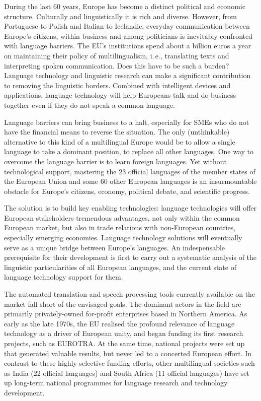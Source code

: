 \documentclass[]{../../metanetpaper}
\begin{document}
\begin{multicols}{2}

During the last 60 years, Europe has become a distinct political and economic structure. Culturally and linguistically it is rich and diverse. However, from Portuguese to Polish and Italian to Icelandic, everyday communication between Europe’s citizens, within business and among politicians is inevitably confronted with language barriers. The EU's institutions spend about a billion euros a year on maintaining their policy of multilingualism, i.\,e., translating texts and interpreting spoken communication. Does this have to be such a burden? Language technology and linguistic research can make a significant contribution to removing the linguistic borders. Combined with intelligent devices and applications, language technology will help Europeans talk and do business together even if they do not speak a common language. 


Language barriers can bring business to a halt, especially for SMEs who do not have the financial means to reverse the situation. The only (unthinkable) alternative to this kind of a multilingual Europe would be to allow a single language to take a dominant position, to replace all other languages. 
One way to overcome the language barrier is to learn foreign languages. Yet without technological support, mastering the 23 official languages of the member states of the European Union and some 60 other European languages is an insurmountable obstacle for Europe’s citizens, economy, political debate, and scientific progress. 

The solution is to build key enabling technologies: language technologies will offer European stakeholders tremendous advantages, not only within the common European market, but also in trade relations with non-European countries, especially emerging economies. Language technology solutions will eventually serve as a unique bridge between Europe's languages. An indespensable prerequisite for their development is first to carry out a systematic analysis of the linguistic particularities of all European languages, and the current state of language technology support for them.  
    
The automated translation and speech processing tools currently available on the market fall short of the envisaged goals. The dominant actors in the field are primarily privately-owned for-profit enterprises based in Northern America. As early as the late 1970s, the EU realised the profound relevance of language technology as a driver of European unity, and began funding its first research projects, such as EUROTRA. At the same time, national projects were set up that generated valuable results, but never led to a concerted European effort. In contrast to these highly selective funding efforts, other multilingual societies such as India (22 official languages) and South Africa (11 official languages) have set up long-term national programmes for language research and technology development. 


\end{multicols}
\end{document}
